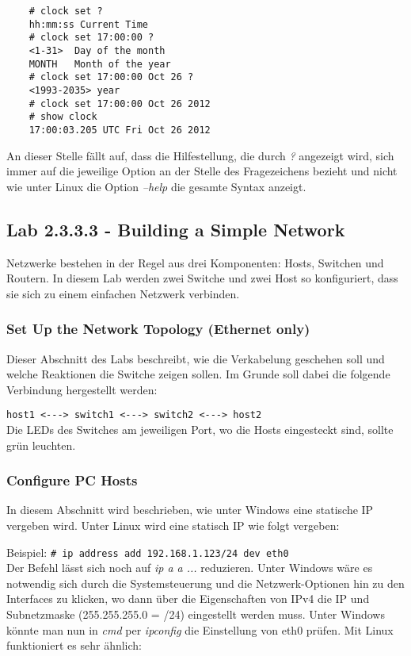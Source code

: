 \begin{lstlisting}
	# clock set ?
	hh:mm:ss Current Time
	# clock set 17:00:00 ?
	<1-31>	Day of the month
	MONTH	Month of the year
	# clock set 17:00:00 Oct 26 ?
	<1993-2035>	year
	# clock set 17:00:00 Oct 26 2012
	# show clock
	17:00:03.205 UTC Fri Oct 26 2012
\end{lstlisting}

\noindent An dieser Stelle fällt auf, dass die Hilfestellung, die durch {\it ?} angezeigt wird, sich immer auf die jeweilige Option an der Stelle des Fragezeichens bezieht und nicht wie unter Linux die Option {\it --help} die gesamte Syntax anzeigt.

\subsection{Lab 2.3.3.3 - Building a Simple Network}

Netzwerke bestehen in der Regel aus drei Komponenten: Hosts, Switchen und Routern. In diesem Lab werden zwei Switche und zwei Host so konfiguriert, dass sie sich zu einem einfachen Netzwerk verbinden.

\subsubsection{Set Up the Network Topology (Ethernet only)}

Dieser Abschnitt des Labs beschreibt, wie die Verkabelung geschehen soll und welche Reaktionen die Switche zeigen sollen. Im Grunde soll dabei die folgende Verbindung hergestellt werden:

\indent	\verb+host1 <---> switch1 <---> switch2 <---> host2+\\

\noindent Die LEDs des Switches am jeweiligen Port, wo die Hosts eingesteckt sind, sollte grün leuchten.

\subsubsection{Configure PC Hosts}

In diesem Abschnitt wird beschrieben, wie unter Windows eine statische IP vergeben wird. Unter Linux wird eine statisch IP wie folgt vergeben:

\indent	Beispiel:
\indent	\verb+# ip address add 192.168.1.123/24 dev eth0+\\

\noindent Der Befehl lässt sich noch auf {\it ip a a ...} reduzieren. Unter Windows wäre es notwendig sich durch die Systemsteuerung und die Netzwerk-Optionen hin zu den Interfaces zu klicken, wo dann über die Eigenschaften von IPv4 die IP und Subnetzmaske (255.255.255.0 = /24) eingestellt werden muss. Unter Windows könnte man nun in {\it cmd} per {\it ipconfig} die Einstellung von eth0 prüfen. Mit Linux funktioniert es sehr ähnlich:

